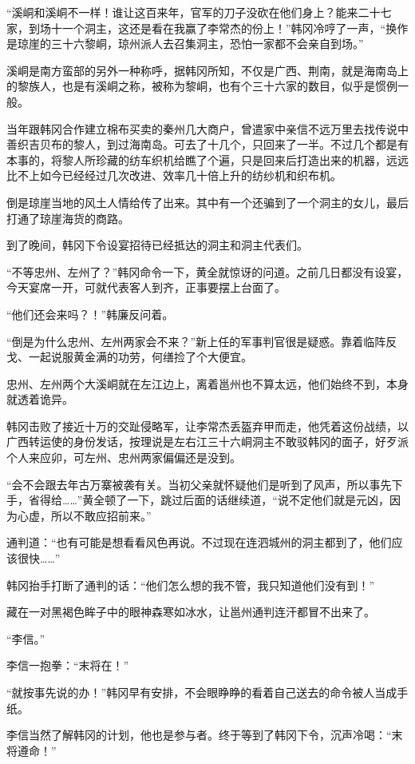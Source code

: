 “溪峒和溪峒不一样！谁让这百来年，官军的刀子没砍在他们身上？能来二十七家，到场十一个洞主，这还是看在我赢了李常杰的份上！”韩冈冷哼了一声，“换作是琼崖的三十六黎峒，琼州派人去召集洞主，恐怕一家都不会亲自到场。”

溪峒是南方蛮部的另外一种称呼，据韩冈所知，不仅是广西、荆南，就是海南岛上的黎族人，也是有溪峒之称，被称为黎峒，也有个三十六家的数目，似乎是惯例一般。

当年跟韩冈合作建立棉布买卖的秦州几大商户，曾遣家中亲信不远万里去找传说中善织吉贝布的黎人，到过海南岛。可去了十几个，只回来了一半。不过几个都是有本事的，将黎人所珍藏的纺车织机给瞧了个遍，只是回来后打造出来的机器，远远比不上如今已经经过几次改进、效率几十倍上升的纺纱机和织布机。

倒是琼崖当地的风土人情给传了出来。其中有一个还骗到了一个洞主的女儿，最后打通了琼崖海货的商路。

到了晚间，韩冈下令设宴招待已经抵达的洞主和洞主代表们。

“不等忠州、左州了？”韩冈命令一下，黄全就惊讶的问道。之前几日都没有设宴，今天宴席一开，可就代表客人到齐，正事要摆上台面了。

“他们还会来吗？！”韩廉反问着。

“倒是为什么忠州、左州两家会不来？”新上任的军事判官很是疑惑。靠着临阵反戈、一起说服黄金满的功劳，何缮捡了个大便宜。

忠州、左州两个大溪峒就在左江边上，离着邕州也不算太远，他们始终不到，本身就透着诡异。

韩冈击败了接近十万的交趾侵略军，让李常杰丢盔弃甲而走，他凭着这份战绩，以广西转运使的身份发话，按理说是左右江三十六峒洞主不敢驳韩冈的面子，好歹派个人来应卯，可左州、忠州两家偏偏还是没到。

“会不会跟去年古万寨被袭有关。当初父亲就怀疑他们是听到了风声，所以事先下手，省得给……”黄全顿了一下，跳过后面的话继续道，“说不定他们就是元凶，因为心虚，所以不敢应招前来。”

通判道：“也有可能是想看看风色再说。不过现在连泗城州的洞主都到了，他们应该很快……”

韩冈抬手打断了通判的话：“他们怎么想的我不管，我只知道他们没有到！”

藏在一对黑褐色眸子中的眼神森寒如冰水，让邕州通判连汗都冒不出来了。

“李信。”

李信一抱拳：“末将在！”

“就按事先说的办！”韩冈早有安排，不会眼睁睁的看着自己送去的命令被人当成手纸。

李信当然了解韩冈的计划，他也是参与者。终于等到了韩冈下令，沉声冷喝：“末将遵命！”

